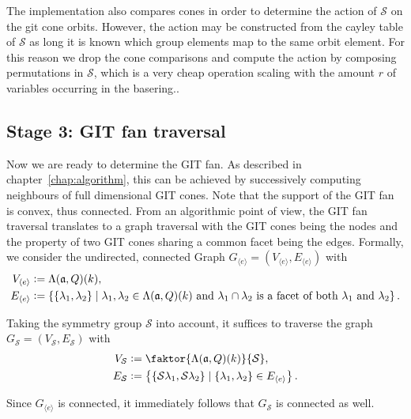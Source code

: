 The \gitfanlib{} implementation also compares cones in order to determine the action of $\mathcal{S}$ on the git cone orbits. However, the action may be constructed from the cayley table of $\mathcal{S}$ as long it is known which group elements map to the same orbit element. For this reason we drop the cone comparisons and compute the action by composing permutations in $\mathcal{S}$, which is a very cheap operation scaling with the amount $r$ of variables occurring in the basering..

\subsection*{Stage 3: GIT fan traversal}


Now we are ready to determine the GIT fan. As described in chapter~\ref{chap:algorithm}, this can be achieved by successively computing neighbours of full dimensional GIT cones. Note that the support of the GIT fan is convex, thus connected. From an algorithmic point of view, the GIT fan traversal translates to a graph traversal with the GIT cones being the nodes and the property of two GIT cones sharing a common facet being the edges. Formally, we consider the undirected, connected Graph $G_{\langle e \rangle}=(V_{\langle e \rangle},E_{\langle e \rangle})$ with
\begin{align*}
V_{\langle e \rangle} &\mathrel{\mathop:}= \Lambda(\mathfrak{a},Q)(k),\\
E_{\langle e \rangle} &\mathrel{\mathop:}= \left\{\{\lambda_1, \lambda_2\} \mid \lambda_1, \lambda_2 \in \Lambda(\mathfrak{a},Q)(k) \text{ and }\lambda_1 \cap \lambda_2 \text{ is a facet of both }\lambda_1\text{ and }\lambda_2\right\}.
\end{align*}

Taking the symmetry group $\mathcal{S}$ into account, it suffices to traverse the graph $G_\mathcal{S} = (V_\mathcal{S}, E_\mathcal{S})$ with
\begin{align*}
V_\mathcal{S} &\defeq \faktor{\Lambda(\mathfrak{a},Q)(k)}{\mathcal{S}},\\
E_\mathcal{S} &\defeq \left\{\{\mathcal{S}\lambda_1, \mathcal{S}\lambda_2\} \mid \{\lambda_1, \lambda_2\} \in  E_{\langle e \rangle}\right\}.
\end{align*}

Since $G_{\langle e \rangle}$ is connected, it immediately follows that $G_\mathcal{S}$ is connected as well.

